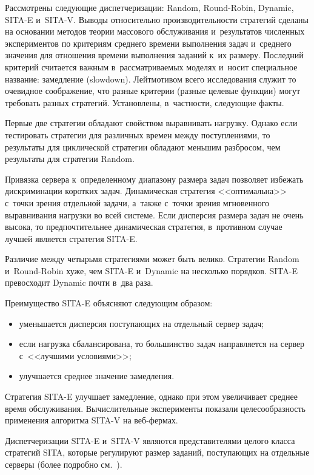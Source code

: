 \begin{multicols}{2}
    Рассмотрены следующие диспетчеризации: Random, Round-Robin, Dynamic, SITA-E 
и~SITA-V. Выводы относительно производительности стра\-тегий сделаны на основании 
методов теории мас\-сового обслуживания и~результатов численных эксперимен\-тов по 
критериям среднего времени выполнения задач и~среднего значения для отношения 
времени выполнения заданий к~их размеру. По\-следний критерий считается важным 
в~рас\-смат\-ри\-ва\-емых моделях и~носит специальное название: замедление (slowdown). 
Лейтмотивом всего исследования служит то очевидное соображение, что разные критерии 
(разные целевые функции) могут требовать разных стратегий. Установлены, в~частности, 
следующие факты.
    
    Первые две стратегии обладают свойством выравнивать нагрузку. Однако если 
тестировать стратегии для различных времен между поступлениями, то результаты для 
циклической стратегии обладают меньшим разбросом, чем результаты для стратегии 
Random.
    
    Привязка сервера к~определенному диапазону размера задач позволяет избежать 
дискриминации коротких задач. 
    Динамическая стратегия <<оптимальна>> с~точки зрения отдельной задачи, а~также 
с~точки зрения мгновенного выравнивания нагрузки во всей сис\-теме.
    Если дисперсия размера задач не очень высока, то предпочтительнее динамическая 
стратегия, в~противном случае лучшей является стратегия SITA-E.
    
    Различие между четырьмя стратегиями может быть велико. Стратегии Random 
и~Round-Robin хуже, чем SITA-E и~Dynamic на несколько порядков. SITA-E превосходит 
Dynamic почти в~два раза.
    
    Преимущество SITA-E объясняют следующим образом:
    \begin{itemize}
    \item уменьшается дисперсия поступающих на отдельный сервер задач;
    \item если нагрузка сбалансирована, то большинство задач направляется на сервер 
с~<<лучшими условиями>>;
    \item улучшается среднее значение замедления.
    \end{itemize}
    
    Стратегия SITA-E улучшает замедление, однако при этом увеличивает среднее время 
обслуживания. Вычислительные эксперименты показали целесообразность применения 
алгоритма SITA-V на веб-фер\-мах.
    
    Диспетчеризации SITA-E и~SITA-V являются представителями целого класса стратегий 
SITA, которые регулируют размер заданий, поступающих на отдельные серверы (более 
подробно см.~\cite{25-kon, 26-kon}).


\end{multicols}
